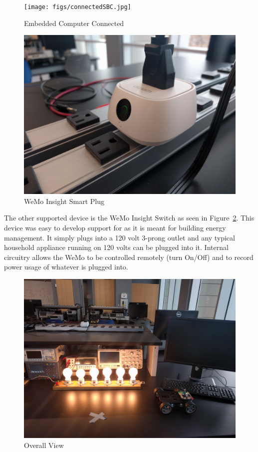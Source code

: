 \begin{figure}[H]
    \centering
    \texttt{[image: figs/connectedSBC.jpg]}
    \caption{Embedded Computer Connected}
    \label{fig:connected_bb}
\end{figure}

\begin{figure}[H]
    \centering
    \includegraphics[scale=0.085]{figs/wemoView.jpg}
    \caption{WeMo Insight Smart Plug}
    \label{fig:wemo}
\end{figure}

The other supported device is the WeMo Insight Switch as seen in Figure~\ref{fig:wemo}. This device was easy to develop support for as it is meant for building energy management. It simply plugs into a 120 volt 3-prong outlet and any typical household appliance running on 120 volts can be plugged into it. Internal circuitry allows the WeMo to be controlled remotely (turn On/Off) and to record power usage of whatever is plugged into.

\begin{figure}[H]
    \centering
    \includegraphics[scale=0.1]{figs/overallView.jpg}
    \caption{Overall View}
    \label{fig:overallView}
\end{figure}

